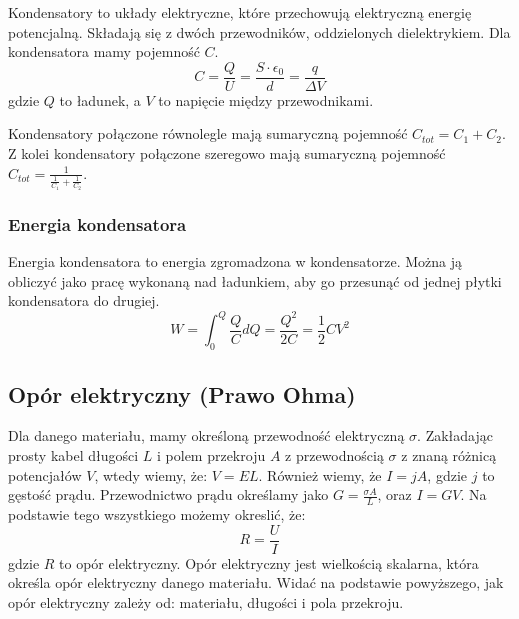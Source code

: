 \documentclass{../notatki}
\begin{document}
Kondensatory to układy elektryczne, które przechowują elektryczną energię
potencjalną. Składają się z dwóch przewodników, oddzielonych dielektrykiem.
Dla kondensatora mamy pojemność $C$.
$$
C = \frac{Q}{U} = \frac{S \cdot \epsilon_0}{d} = \frac{q}{\Delta V}
$$
gdzie $Q$ to ładunek, a $V$ to napięcie między przewodnikami.
\begin{figure*}[h]
  \centering
\end{figure*}
Kondensatory połączone równolegle mają sumaryczną pojemność $C_{tot}
= C_1 + C_2$. Z kolei kondensatory połączone szeregowo mają sumaryczną pojemność
$C_{tot} = \frac{1}{\frac{1}{C_1} + \frac{1}{C_2}}$.

\subsubsection{Energia kondensatora}

Energia kondensatora to energia zgromadzona w kondensatorze. Można ją
obliczyć jako pracę wykonaną nad ładunkiem, aby go przesunąć od jednej płytki
kondensatora do drugiej.
$$
W = \int_{0}^{Q} \frac{Q}{C} dQ = \frac{Q^2}{2C} = \frac{1}{2} C V^2
$$

\subsection{Opór elektryczny (Prawo Ohma)}

Dla danego materiału, mamy określoną przewodność elektryczną $\sigma$.
Zakładając prosty kabel długości $L$ i polem przekroju $A$ z przewodnością
$\sigma$ z znaną różnicą potencjałów $V$, wtedy wiemy, że: $V = EL$. Również
wiemy, że $I = jA$, gdzie $j$ to gęstość prądu. Przewodnictwo prądu określamy
jako $G = \frac{\sigma A}{L}$, oraz $I = GV$. Na podstawie tego wszystkiego
możemy okreslić, że:
$$
R = \frac{U}{I}
$$
gdzie $R$ to opór elektryczny. Opór
elektryczny jest wielkością skalarna, która określa opór elektryczny danego
materiału. Widać na podstawie powyższego, jak opór elektryczny zależy od:
materiału, długości i pola przekroju.
\end{document}
